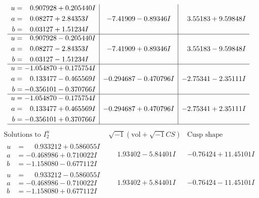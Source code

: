 \documentclass[1p]{elsarticle_modified}
\theoremstyle{definition}
\newcommand{\I}{\sqrt{-1}}
\begin{document}
$$\begin{array}{c|c|c}
\begin{aligned}
u &= \phantom{-}0.907928 + 0.205440 I \\
a &= \phantom{-}0.08277 + 2.84353 I \\
b &= \phantom{-}0.03127 + 1.51234 I\end{aligned}
 & -7.41909 - 0.89346 I & \phantom{-}3.55183 + 9.59848 I \\ \hline\begin{aligned}
u &= \phantom{-}0.907928 - 0.205440 I \\
a &= \phantom{-}0.08277 - 2.84353 I \\
b &= \phantom{-}0.03127 - 1.51234 I\end{aligned}
 & -7.41909 + 0.89346 I & \phantom{-}3.55183 - 9.59848 I \\ \hline\begin{aligned}
u &= -1.054870 + 0.175754 I \\
a &= \phantom{-}0.133477 - 0.465569 I \\
b &= -0.356101 - 0.370766 I\end{aligned}
 & -0.294687 - 0.470796 I & -2.75341 - 2.35111 I \\ \hline\begin{aligned}
u &= -1.054870 - 0.175754 I \\
a &= \phantom{-}0.133477 + 0.465569 I \\
b &= -0.356101 + 0.370766 I\end{aligned}
 & -0.294687 + 0.470796 I & -2.75341 + 2.35111 I\\
 \hline 
 \end{array}$$\newpage$$\begin{array}{c|c|c}  
\text{Solutions to }I^u_{2}& \I (\text{vol} + \sqrt{-1}CS) & \text{Cusp shape}\\
 \hline 
\begin{aligned}
u &= \phantom{-}0.933212 + 0.586055 I \\
a &= -0.468986 + 0.710022 I \\
b &= -1.158080 - 0.677112 I\end{aligned}
 & \phantom{-}1.93402 - 5.84401 I & -0.76424 + 11.45101 I \\ \hline\begin{aligned}
u &= \phantom{-}0.933212 - 0.586055 I \\
a &= -0.468986 - 0.710022 I \\
b &= -1.158080 + 0.677112 I\end{aligned}
 & \phantom{-}1.93402 + 5.84401 I & -0.76424 - 11.45101 I \\ \hline\begin{aligned}

\end{aligned}
\end{array}$$
\end{document}
